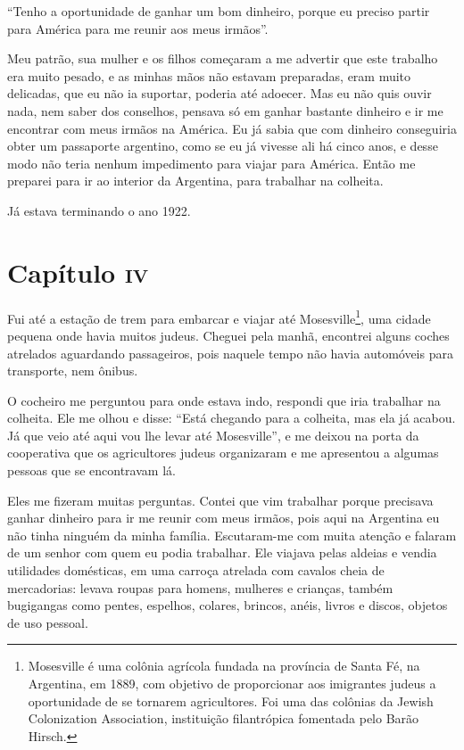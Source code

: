``Tenho a oportunidade de ganhar um bom dinheiro, porque eu preciso
partir para América para me reunir aos meus irmãos''.

Meu patrão, sua mulher e os filhos começaram a me advertir que este
trabalho era muito pesado, e as minhas mãos não estavam preparadas, eram
muito delicadas, que eu não ia suportar, poderia até adoecer. Mas eu não
quis ouvir nada, nem saber dos conselhos, pensava só em ganhar bastante
dinheiro e ir me encontrar com meus irmãos na América. Eu já sabia que
com dinheiro conseguiria obter um passaporte argentino, como se eu já
vivesse ali há cinco anos, e desse modo não teria nenhum impedimento
para viajar para América. Então me preparei para ir ao interior da
Argentina, para trabalhar na colheita.

Já estava terminando o ano 1922.

\chapter{Capítulo \textsc{iv}}

Fui até a estação de trem para embarcar e viajar até
Mosesville\footnote{Mosesville é uma colônia agrícola fundada na província de
  Santa Fé, na Argentina, em 1889, com objetivo de proporcionar aos
  imigrantes judeus a oportunidade de se tornarem agricultores. Foi uma
  das colônias da Jewish Colonization Association, instituição
  filantrópica fomentada pelo Barão Hirsch.}, uma cidade pequena onde
havia muitos judeus. Cheguei pela manhã, encontrei alguns coches
atrelados aguardando passageiros, pois naquele tempo não havia
automóveis para transporte, nem ônibus.

O cocheiro me perguntou para onde estava indo, respondi que iria
trabalhar na colheita. Ele me olhou e disse: ``Está chegando para a
colheita, mas ela já acabou. Já que veio até aqui vou lhe levar até
Mosesville'', e me deixou na porta da cooperativa que os agricultores
judeus organizaram e me apresentou a algumas pessoas que se encontravam
lá.

Eles me fizeram muitas perguntas. Contei que vim trabalhar porque
precisava ganhar dinheiro para ir me reunir com meus irmãos, pois aqui
na Argentina eu não tinha ninguém da minha família. Escutaram-me com
muita atenção e falaram de um senhor com quem eu podia trabalhar. Ele
viajava pelas aldeias e vendia utilidades domésticas, em uma carroça
atrelada com cavalos cheia de mercadorias: levava roupas para homens,
mulheres e crianças, também bugigangas como pentes, espelhos, colares,
brincos, anéis, livros e discos, objetos de uso pessoal.

